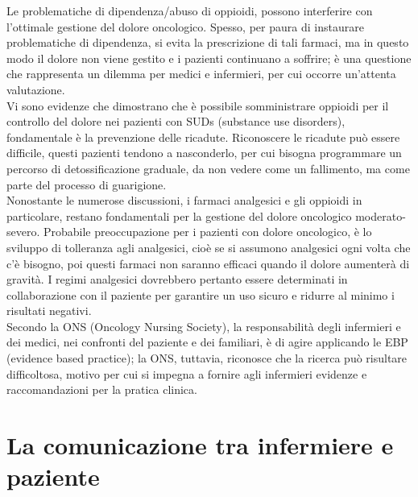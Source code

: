 Le problematiche di dipendenza/abuso di oppioidi, possono interferire con l’ottimale gestione del dolore oncologico. 
Spesso, per paura di instaurare problematiche di dipendenza, si evita la prescrizione di tali farmaci, 
ma in questo modo il dolore non viene gestito e i pazienti continuano a soffrire; 
è una questione che rappresenta un dilemma per medici e infermieri, per cui occorre un’attenta valutazione\cite{PAINONS}.\\ 
Vi sono evidenze che dimostrano che è possibile somministrare oppioidi per il controllo del dolore nei pazienti con SUDs 
(substance use disorders), fondamentale è la prevenzione delle ricadute\cite{CANCERPAINONS}. Riconoscere le ricadute può essere difficile, 
questi pazienti tendono a nasconderlo, per cui bisogna programmare un percorso di detossificazione graduale, 
da non vedere come un fallimento, ma come parte del processo di guarigione\cite{CANCERPAINONS}.\\
Nonostante le numerose discussioni, i farmaci analgesici e gli oppioidi in particolare, restano fondamentali per 
la gestione del dolore oncologico moderato-severo. Probabile preoccupazione per i pazienti con dolore oncologico, 
è lo sviluppo di tolleranza agli analgesici, cioè se si assumono analgesici ogni volta che c’è bisogno, poi questi 
farmaci non saranno efficaci quando il dolore aumenterà di gravità. I regimi analgesici dovrebbero pertanto essere 
determinati in collaborazione con il paziente per garantire un uso sicuro e ridurre al minimo i risultati negativi\cite{analgesici}.\\ 

Secondo la ONS (Oncology Nursing Society), la responsabilità degli infermieri e dei medici, nei confronti 
del paziente e dei familiari, è di agire applicando le EBP (evidence based practice); 
la ONS, tuttavia, riconosce che la ricerca può risultare difficoltosa, 
motivo per cui si impegna a fornire agli infermieri evidenze e raccomandazioni per la pratica clinica\cite{PAINONS}.

\section{La comunicazione tra infermiere e paziente}

